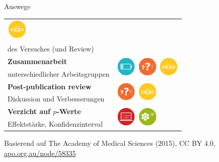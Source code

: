 \documentclass{beamer}
\begin{document}
\begin{frame}{Auswege}
\begin{tabular}{>{\raggedright}p{5.5cm}l}
{            \includegraphics[width=1cm]{weak_experimental_design}} \\
        des Versuches (und Review) & \\[1em]
        \textbf{Zusammenarbeit} & \multirow{2}{*}{%
            \includegraphics[width=1cm]{underpowered_study}
            \includegraphics[width=1cm]{underspecified_method}
            \includegraphics[width=1cm]{weak_experimental_design}} \\
        unterschiedlicher Arbeitsgruppen & \\[1em]
        \textbf{Post-publication review} & \multirow{2}{*}{%
            \includegraphics[width=1cm]{underspecified_method}
            \includegraphics[width=1cm]{weak_experimental_design}} \\
        Diskussion und Verbesserungen & \\[1em]
        \textbf{Verzicht auf $p$-Werte} & \multirow{2}{*}{%
            \includegraphics[width=1cm]{data_dredging}
            \includegraphics[width=1cm]{omitting_null_results}} \\
        Effektstärke, Konfidenzinterval
        & \\
    \end{tabular}

    \vspace{1cm}
    {\ft Basierend auf The Academy of Medical Sciences (2015), CC
    BY 4.0, \href{http://apo.org.au/node/58335}{apo.org.au/node/58335}}

\end{frame}
\end{document}
